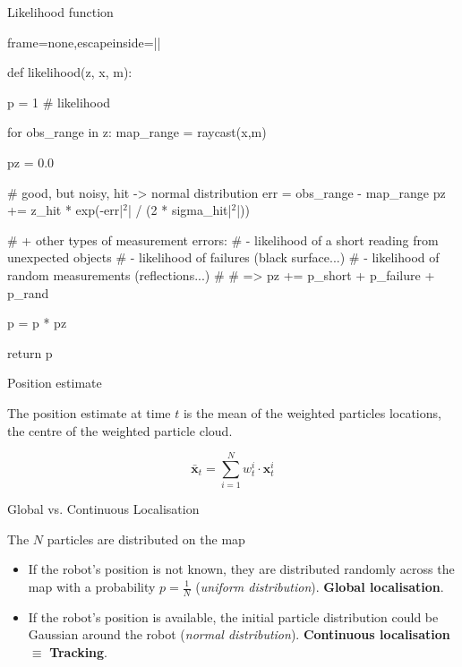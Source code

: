 \documentclass[compress]{beamer}
\begin{document}

\begin{frame}[fragile]{Likelihood function}

\begin{pythoncode*}{frame=none,escapeinside=||}

def likelihood(z, x, m):

    p = 1 # likelihood

    for obs_range in z:
        map_range = raycast(x,m)

        pz = 0.0

        # good, but noisy, hit -> normal distribution
        err = obs_range - map_range
        pz += z_hit * exp(-err|$^2$| / (2 * sigma_hit|$^2$|))

        # + other types of measurement errors:
        #    - likelihood of a short reading from unexpected objects
        #    - likelihood of failures (black surface...)
        #    - likelihood of random measurements (reflections...)
        #
        # => pz += p_short + p_failure + p_rand

        p = p * pz

    return p
\end{pythoncode*}

\end{frame}




\begin{frame}{Position estimate}

    The position estimate at time $t$ is the mean of the weighted particles locations,
    \ie the centre of the weighted particle cloud.

    \Large
    \[
        \bar{\mathbf{x}}_t = \sum^N_{i=1} w^i_t \cdot \mathbf{x}^i_t
    \]
\end{frame}

\begin{frame}{Global vs. Continuous Localisation}

    The $N$ particles are distributed on the map

    \begin{itemize}
        \item If the robot's position is not known, they are distributed randomly
            across the map with a probability $p=\frac{1}{N}$ (\emph{uniform
            distribution}). \textbf{Global localisation}.

        \item If the robot's position is available, the initial particle
            distribution could be Gaussian around the robot (\emph{normal
            distribution}). \textbf{Continuous localisation} $\equiv$
            \textbf{Tracking}.
    \end{itemize}

\end{frame}
\end{document}

